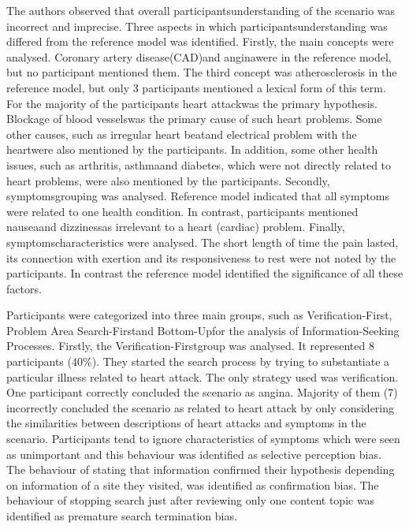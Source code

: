 \documentclass[]{article}
\begin{document}
\begin{enumerate}
The authors observed that overall participants\textquotesingle understanding of the scenario was incorrect and imprecise. Three aspects in which participants\textquotesingle understanding was differed from the reference model was identified. Firstly, the main concepts were analysed. \textquotesingle Coronary artery disease(CAD)\textquotesingle  and \textquotesingle angina\textquotesingle were in the reference model, but no participant mentioned them. The third concept was atherosclerosis in the reference model, but only 3 participants mentioned a lexical form of this term. For the majority of the participants \textquotesingle heart attack\textquotesingle was the primary hypothesis. Blockage of blood vessels\textquotesingle  was the primary cause of such heart problems. Some other causes, such as \textquotesingle irregular heart beat\textquotesingle  and \textquotesingle electrical problem with the heart\textquotesingle  were also mentioned by the participants. In addition, some other health issues, such as \textquotesingle arthritis\textquotesingle, \textquotesingle asthma\textquotesingle and \textquotesingle diabetes\textquotesingle, which were not directly related to heart problems, were also mentioned by the participants. Secondly, symptoms\textquotesingle  grouping was analysed. Reference model indicated that all symptoms were related to one health condition. In contrast, participants mentioned \textquotesingle nausea\textquotesingle and \textquotesingle dizziness\textquotesingle as irrelevant to a heart (cardiac) problem. Finally, symptoms\textquotesingle  characteristics were analysed. The short length of time the pain lasted, its connection with exertion and its responsiveness to rest were not noted by the participants. In contrast the reference model identified the significance of all these factors. 

Participants were categorized into three main groups, such as \textquotesingle Verification-First\textquotesingle, \textquotesingle Problem Area Search-First\textquotesingle and \textquotesingle Bottom-Up\textquotesingle for the analysis of Information-Seeking Processes. Firstly, the \textquotesingle Verification-First\textquotesingle  group was analysed. It represented 8 participants (40\%). They started the search process by trying to substantiate a particular illness related to heart attack. The only strategy used was \textquotesingle verification\textquotesingle. One participant correctly concluded the scenario as angina. Majority of them (7) incorrectly concluded the scenario as related to heart attack by only considering the similarities between descriptions of heart attacks and symptoms in the scenario. Participants tend to ignore characteristics of symptoms which were seen as unimportant and this behaviour was identified as \textquotesingle selective perception bias\textquotesingle. The behaviour of stating that information confirmed their hypothesis depending on information of a site they visited, was identified as \textquotesingle confirmation bias\textquotesingle. The behaviour of stopping search just after reviewing only one content topic was identified as \textquotesingle premature search termination bias\textquotesingle. 


\end{enumerate}
\end{document}
